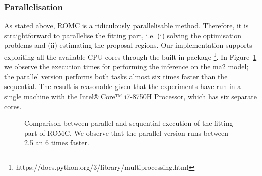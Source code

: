 \subsubsection*{Parallelisation}

As stated above, ROMC is a ridiculously parallelisable
method. Therefore, it is straightforward to parallelise the fitting
part, i.e. (i) solving the optimisation problems and (ii) estimating
the proposal regions. Our implementation supports exploiting all the
available CPU cores through the built-in  package
\footnote{https://docs.python.org/3/library/multiprocessing.html}. In
Figure~\ref{fig:exec_parallel} we observe the execution times for
performing the inference on the ma2 model; the parallel version
performs both tasks almost six times faster than the sequential. The
result is reasonable given that the experiments have run in a single
machine with the Intel® Core™ i7-8750H Processor, which has six
separate cores.


\begin{figure}[ht]
  \begin{center}
    \resizebox{.49\columnwidth}{!}{%
      
    }
    \resizebox{.49\columnwidth}{!}{%
      
    }
    \end{center}
    \caption[Execution time exploiting parallelisation]{Comparison
      between parallel and sequential execution of the fitting part of
      ROMC. We observe that the parallel version runs between 2.5 an 6
      times faster.}
      \label{fig:exec_parallel}
\end{figure}
